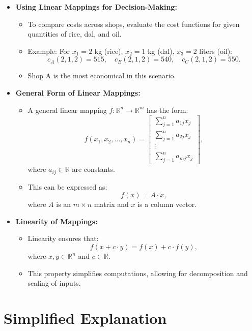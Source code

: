 \documentclass{article}
\begin{document}
\begin{itemize}
  \item \textbf{Using Linear Mappings for Decision-Making:}
    \begin{itemize}
      \item To compare costs across shops, evaluate the cost functions for given quantities of rice, dal, and oil.
      \item Example: For $x_1 = 2$ kg (rice), $x_2 = 1$ kg (dal), $x_3 = 2$ liters (oil):
        \[
          c_A(2, 1, 2) = 515, \quad c_B(2, 1, 2) = 540, \quad c_C(2, 1, 2) = 550.
        \]
      \item Shop A is the most economical in this scenario.
    \end{itemize}

  \item \textbf{General Form of Linear Mappings:}
    \begin{itemize}
      \item A general linear mapping $f: \mathbb{R}^n \to \mathbb{R}^m$ has the form:
        \[
          f(x_1, x_2, \dots, x_n) =
          \begin{bmatrix}
            \sum_{j=1}^n a_{1j}x_j \\
            \sum_{j=1}^n a_{2j}x_j \\
            \vdots \\
            \sum_{j=1}^n a_{mj}x_j
          \end{bmatrix},
        \]
        where $a_{ij} \in \mathbb{R}$ are constants.
      \item This can be expressed as:
        \[
          f(x) = A \cdot x,
        \]
        where $A$ is an $m \times n$ matrix and $x$ is a column vector.
    \end{itemize}

  \item \textbf{Linearity of Mappings:}
    \begin{itemize}
      \item Linearity ensures that:
        \[
          f(x + c \cdot y) = f(x) + c \cdot f(y),
        \]
        where $x, y \in \mathbb{R}^n$ and $c \in \mathbb{R}$.
      \item This property simplifies computations, allowing for decomposition and scaling of inputs.
    \end{itemize}
\end{itemize}

\section*{Simplified Explanation}
\end{document}
